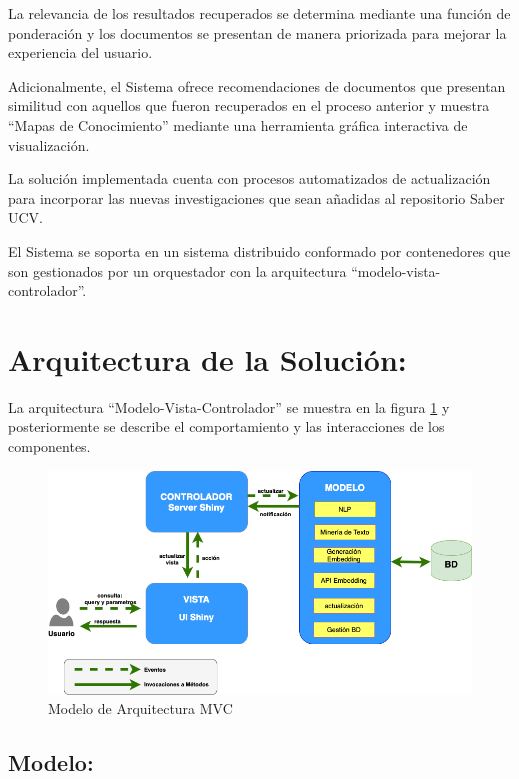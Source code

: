 \documentclass[
  12pt,
  openany]{book}
\begin{document}
La relevancia de los resultados recuperados se determina mediante una función de ponderación y los documentos se presentan de manera priorizada para mejorar la experiencia del usuario.

Adicionalmente, el Sistema ofrece recomendaciones de documentos que presentan similitud con aquellos que fueron recuperados en el proceso anterior y muestra ``Mapas de Conocimiento'' mediante una herramienta gráfica interactiva de visualización.

La solución implementada cuenta con procesos automatizados de actualización para incorporar las nuevas investigaciones que sean añadidas al repositorio Saber UCV.

El Sistema se soporta en un sistema distribuido conformado por contenedores que son gestionados por un orquestador con la arquitectura ``modelo-vista-controlador''.

\hypertarget{desarrolloarquitectura}{%
\section{Arquitectura de la Solución:}\label{desarrolloarquitectura}}

La arquitectura ``Modelo-Vista-Controlador'' se muestra en la figura \ref{fig:arquitecturamvc} y posteriormente se describe el comportamiento y las interacciones de los componentes.

\begin{figure}

{\centering \includegraphics[width=0.9\linewidth]{images/05-desarrollo/MVC9} 

}

\caption{Modelo de Arquitectura MVC}\label{fig:arquitecturamvc}
\end{figure}

\hypertarget{modelo}{%
\subsection{\texorpdfstring{\textbf{Modelo:}}{Modelo:}}\label{modelo}}
\end{document}
